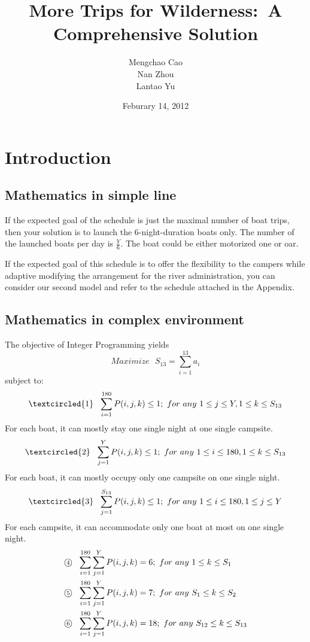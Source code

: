 \documentclass[a4paper, 12pt]{article}
\title{More Trips for Wilderness:~A Comprehensive Solution}
\author{Mengchao Cao\\Nan Zhou\\
Lantao Yu}
\date{Feburary 14, 2012}
\begin{document}
\maketitle
\section{Introduction}
\subsection{Mathematics in simple line}

If the expected goal of the schedule is just the maximal number of boat trips, then your solution is to launch the 6-night-duration boats only. The number of the launched boats per day is $\frac{Y}{6}$. The boat could be either motorized one or oar.

If the expected goal of this schedule is to offer the flexibility to the campers while adaptive modifying the arrangement for the river administration, you can consider our second model and refer to the schedule attached in the Appendix.

\subsection{Mathematics in complex environment}

The objective of Integer Programming yields\\
\begin{equation}
Maximize~~~S_{13}=\sum_{i=1}^{13} a_i 
\end{equation}
subject to: \\
\begin{equation}
\textcircled{\scriptsize 1}~~
\sum_{i=1}^{180}P(i,j,k)\leq1;~for~any~1\leq j\leq Y,1\leq k\leq S_{13}
\end{equation}
For each boat, it can mostly stay one single night at one single campsite.
\begin{equation}
\textcircled{\scriptsize 2}~~
\sum_{j=1}^Y P(i,j,k)\leq1;~for~any~1\leq i\leq180,1\leq k\leq S_{13}
\end{equation}
For each boat, it can mostly occupy only one campsite on one single night.
\begin{equation}
\textcircled{\scriptsize 3}~~
\sum_{j=1}^{S_{13}} P(i,j,k)\leq1;~for~any~1\leq i\leq180,1\leq j\leq Y
\end{equation}
For each campsite, it can accommodate only one boat at most on one single night.
\begin{equation}
\begin{split}
\mbox{\textcircled{\scriptsize 4}}~~&\sum_{i=1}^{180}\sum_{j=1}^YP(i,j,k)=6;~for~any~ 1\leq k\leq S_1\\
\mbox{\textcircled{\scriptsize 5}}~~&\sum_{i=1}^{180}\sum_{j=1}^YP(i,j,k)=7;~for~any~S_1\leq k\leq S_2\\
\mbox{\textcircled{\scriptsize 6}}~~&\sum_{i=1}^{180}\sum_{j=1}^YP(i,j,k)=18;~for~any~S_{12}\leq k\leq S_{13}
\end{split}
\end{equation}
\end{document}
